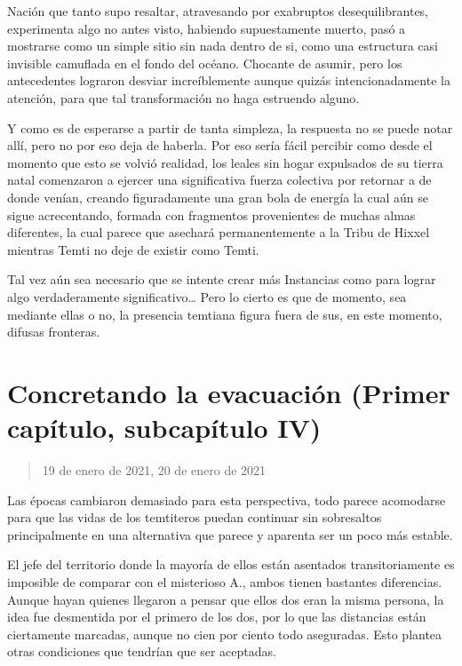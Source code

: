 \documentclass[
  spanish,
]{book}
\begin{document}
Nación que tanto supo resaltar, atravesando por exabruptos desequilibrantes, experimenta algo no antes visto, habiendo supuestamente muerto, pasó a mostrarse como un simple sitio sin nada dentro de si, como una estructura casi invisible camuflada en el fondo del océano. Chocante de asumir, pero los antecedentes lograron desviar increíblemente aunque quizás intencionadamente la atención, para que tal transformación no haga estruendo alguno.

Y como es de esperarse a partir de tanta simpleza, la respuesta no se puede notar allí, pero no por eso deja de haberla. Por eso sería fácil percibir como desde el momento que esto se volvió realidad, los leales sin hogar expulsados de su tierra natal comenzaron a ejercer una significativa fuerza colectiva por retornar a de donde venían, creando figuradamente una gran bola de energía la cual aún se sigue acrecentando, formada con fragmentos provenientes de muchas almas diferentes, la cual parece que asechará permanentemente a la Tribu de Hixxel mientras Temti no deje de existir como Temti.

Tal vez aún sea necesario que se intente crear más Instancias como para lograr algo verdaderamente significativo\ldots{} Pero lo cierto es que de momento, sea mediante ellas o no, la presencia temtiana figura fuera de sus, en este momento, difusas fronteras.

\hypertarget{concretando-la-evacuaciuxf3n-primer-capuxedtulo-subcapuxedtulo-iv}{%
\section{Concretando la evacuación (Primer capítulo, subcapítulo IV)}\label{concretando-la-evacuaciuxf3n-primer-capuxedtulo-subcapuxedtulo-iv}}

\begin{quote}
19 de enero de 2021, 20 de enero de 2021
\end{quote}

Las épocas cambiaron demasiado para esta perspectiva, todo parece acomodarse para que las vidas de los temtiteros puedan continuar sin sobresaltos principalmente en una alternativa que parece y aparenta ser un poco más estable.

El jefe del territorio donde la mayoría de ellos están asentados transitoriamente es imposible de comparar con el misterioso A., ambos tienen bastantes diferencias. Aunque hayan quienes llegaron a pensar que ellos dos eran la misma persona, la idea fue desmentida por el primero de los dos, por lo que las distancias están ciertamente marcadas, aunque no cien por ciento todo aseguradas. Esto plantea otras condiciones que tendrían que ser aceptadas.
\end{document}

